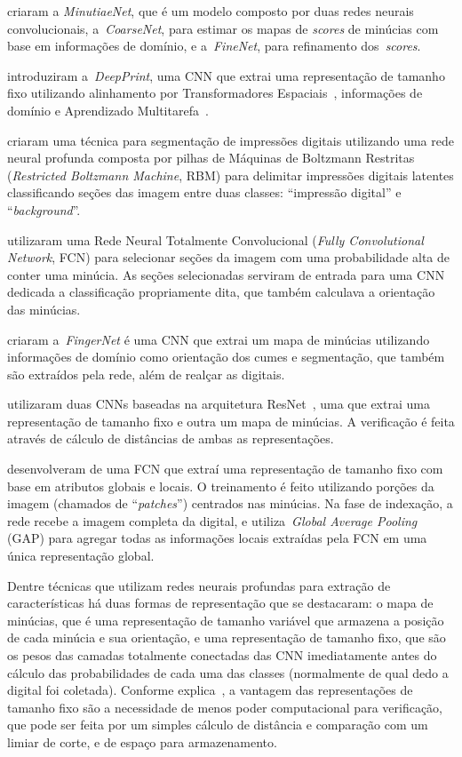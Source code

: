  criaram a \textit{MinutiaeNet}, que é um modelo composto por duas redes neurais convolucionais, a~\textit{CoarseNet}, para estimar os mapas de \textit{scores} de minúcias com base em informações de domínio, e a~\textit{FineNet}, para refinamento dos~\textit{scores}.

 introduziram a~\textit{DeepPrint}, uma CNN que extrai uma representação de tamanho fixo utilizando alinhamento por Transformadores Espaciais~\cite{spatial-transformer-networks}, informações de domínio e Aprendizado Multitarefa~\cite{multitask-learning}.

 criaram uma técnica para segmentação de impressões digitais utilizando uma rede neural profunda composta por pilhas de Máquinas de Boltzmann Restritas (\textit{Restricted Boltzmann Machine}, RBM) para delimitar impressões digitais latentes classificando seções das imagem entre duas classes: ``impressão digital'' e ``\textit{background}''. 

 utilizaram uma Rede Neural Totalmente Convolucional (\textit{Fully Convolutional Network}, FCN) para selecionar seções da imagem com uma probabilidade alta de conter uma minúcia. As seções selecionadas serviram de entrada para uma CNN dedicada a classificação propriamente dita, que também calculava a orientação das minúcias.

 criaram a~\textit{FingerNet} é uma CNN que extrai um mapa de minúcias utilizando informações de domínio como orientação dos cumes e segmentação, que também são extraídos pela rede, além de realçar as digitais.

 utilizaram duas CNNs baseadas na arquitetura ResNet~\cite{inception-v4}, uma que extrai uma representação de tamanho fixo e outra um mapa de minúcias. A verificação é feita através de cálculo de distâncias de ambas as representações.

 desenvolveram de uma FCN que extraí uma representação de tamanho fixo com base em atributos globais e locais. O treinamento é feito utilizando porções da imagem (chamados de ``\textit{patches}'') centrados nas minúcias. Na fase de indexação, a rede recebe a imagem completa da digital, e utiliza~\textit{Global Average Pooling} (GAP) para agregar todas as informações locais extraídas pela FCN em uma única representação global.

Dentre técnicas que utilizam redes neurais profundas para extração de características há duas formas de representação que se destacaram: o mapa de minúcias, que é uma representação de tamanho variável que armazena a posição de cada minúcia e sua orientação, e uma representação de tamanho fixo, que são os pesos das camadas totalmente conectadas das CNN imediatamente antes do cálculo das probabilidades de cada uma das classes (normalmente de qual dedo a digital foi coletada). Conforme explica~, a vantagem das representações de tamanho fixo são a necessidade de menos poder computacional para verificação, que pode ser feita por um simples cálculo de distância e comparação com um limiar de corte, e de espaço para armazenamento.


